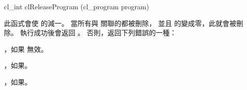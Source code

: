 
\startCLFUNC
cl_int clReleaseProgram (cl_program program)
\stopCLFUNC

此函式會使  的減一。
當所有與  關聯的都被刪除，
並且  的變成零，此就會被刪除。
執行成功後會返回 。
否則，返回下列錯誤的一種：
\startigBase
\item {}，如果  無效。

\item {}，如果\scdevfailres。

\item {}，如果\schostfailres。
\stopigBase
